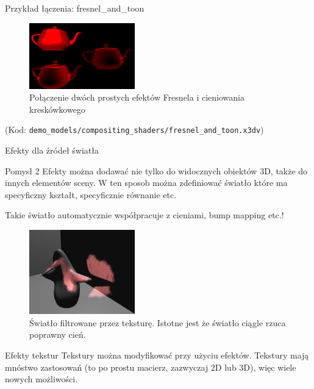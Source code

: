 \documentclass{beamer}
\begin{document}
\begin{frame}{Przykład łączenia: fresnel\_and\_toon}
\begin{figure}
  \centering
  \includegraphics[width=1.8in]{../fresnel_and_toon}
  \caption{Połączenie dwóch prostych efektów Fresnela i cieniowania kreskówkowego}
\end{figure}

(Kod: \texttt{demo\_models/compositing\_shaders/fresnel\_and\_toon.x3dv})

\end{frame}

\begin{frame}{Efekty dla źródeł światła}
\begin{block}{Pomysł 2}
Efekty można dodawać nie tylko do widocznych obiektów 3D,
także do innych elementów sceny. W ten sposob można zdefiniować
światło które ma specyficzny kształt, specyficznie równanie etc.
\end{block}

Takie światło automatycznie współpracuje z cieniami, bump mapping etc.!

\begin{figure}
  \centering
  \includegraphics[width=1.8in]{../fancy_light_spot_shape}
  \caption{Światło filtrowane przez teksturę. Istotne jest że światło ciągle rzuca poprawny cień.}
\end{figure}
\end{frame}

\begin{frame}{Efekty tekstur}
Tekstury można modyfikować przy użyciu efektów. Tekstury mają mnóstwo
zastosowań (to po prostu macierz, zazwyczaj 2D lub 3D), więc wiele nowych
możliwości.
\end{frame}
\end{document}
